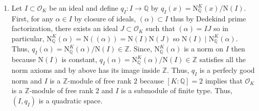 \documentclass[12pt]{extarticle}
\newcommand{\divides}{\mid}
\newcommand{\Z}{\mathbb{Z}}
\newcommand{\Q}{\mathbb{Q}}
\newcommand{\ints}[1]{\mathcal{O}_{#1}}
\newcommand{\qnorm}[2]{\mathrm{N}^{#1}_{\Q}\left(#2\right)}
\newcommand{\inorm}[1]{\mathrm{N}(#1)}
\begin{document}
\begin{enumerate}
\begin{enumerate}
\item Let $I \subset \ints{K}$ be an ideal and define $q_I : I \rightarrow \Q$ by $q_I(x) = \qnorm{K}{x} / \mathrm{N}(I)$. First, for any $\alpha \in I$ by closure of ideals, $(\alpha) \subset I$ thus by Dedekind prime factorization, there exists an ideal $J \subset \ints{K}$ such that $(\alpha) = IJ$ so in particular, $\qnorm{K}{\alpha} = \inorm{(\alpha)} = \inorm{I} \inorm{J}$ so $\inorm{I} \divides \qnorm{K}{\alpha}$. Thus, $q_I(\alpha) = \qnorm{K}{\alpha} / \inorm{I} \in \Z$. Since, $\qnorm{K}{\alpha}$ is a norm on $I$ then because $\inorm{I}$ is constant, $q_I(\alpha) = \qnorm{K}{\alpha} / \inorm{I} \in \Z$ satisfies all the norm axioms and by above has its image inside $\Z$. Thus, $q_I$ is a perfecly good norm and $I$ is a $\Z$-module of free rank $2$ because $[K : \Q] = 2$ implies that $\ints{K}$ is a $\Z$-module of free rank $2$ and $I$ is a submodule of finite type. Thus, $(I, q_I)$ is a quadratic space. 


\end{enumerate}
\end{enumerate}
\end{document}

